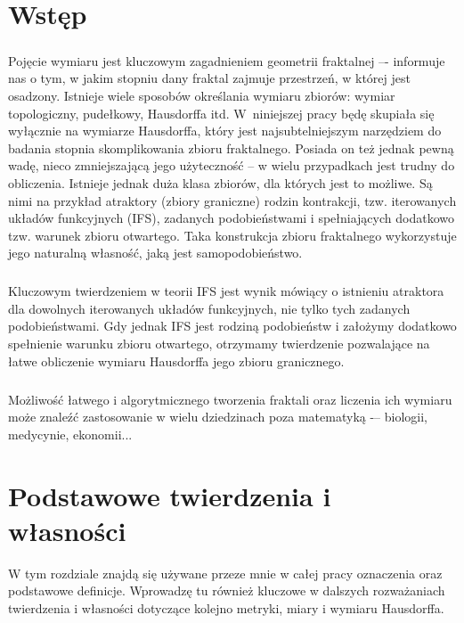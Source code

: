 \documentclass{mini}
\begin{document}
\chapter*{Wstęp}

\begin{doublespace}
\paragraph{}
Pojęcie wymiaru jest kluczowym zagadnieniem geometrii fraktalnej –- informuje nas o tym, w jakim stopniu dany fraktal zajmuje przestrzeń, w której jest osadzony. Istnieje wiele sposobów określania wymiaru zbiorów: wymiar topologiczny, pudełkowy, Hausdorffa itd. W~niniejszej pracy będę skupiała się wyłącznie na wymiarze Hausdorffa, który jest najsubtelniejszym narzędziem do badania stopnia skomplikowania zbioru fraktalnego. Posiada on też jednak pewną wadę, nieco zmniejszającą jego użyteczność -- w wielu przypadkach jest trudny do obliczenia. Istnieje jednak duża klasa zbiorów, dla których jest to możliwe. Są nimi na przykład atraktory (zbiory graniczne) rodzin kontrakcji, tzw. iterowanych układów funkcyjnych (IFS), zadanych podobieństwami i spełniających dodatkowo tzw. warunek zbioru otwartego. Taka konstrukcja zbioru fraktalnego wykorzystuje jego naturalną własność, jaką jest samopodobieństwo. 
\paragraph{}
Kluczowym twierdzeniem w teorii IFS jest wynik mówiący o istnieniu atraktora dla dowolnych iterowanych układów funkcyjnych, nie tylko tych zadanych podobieństwami. Gdy jednak IFS jest rodziną podobieństw i założymy dodatkowo spełnienie warunku zbioru otwartego, otrzymamy twierdzenie pozwalające na łatwe obliczenie wymiaru Hausdorffa jego zbioru granicznego. 
\paragraph{}
Możliwość łatwego i algorytmicznego tworzenia fraktali oraz liczenia ich wymiaru może znaleźć zastosowanie w wielu dziedzinach poza matematyką -– biologii, medycynie, ekonomii...
\end{doublespace}

\chapter{Podstawowe twierdzenia i własności}

W tym rozdziale znajdą się używane przeze mnie w całej pracy oznaczenia oraz podstawowe definicje. Wprowadzę tu również kluczowe w dalszych rozważaniach twierdzenia i własności dotyczące kolejno metryki, miary i wymiaru Hausdorffa.
\end{document}
